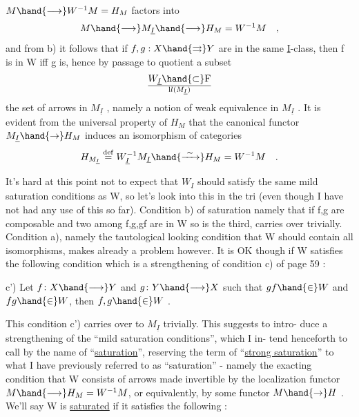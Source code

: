 
$M\hand{\longrightarrow} W^{-1}M=H_M$ factors into
\[ M\hand{\longrightarrow} M_{\underline{I}}\hand{\longrightarrow} H_M = W^{-1}M \quad , \]
and from b) it follows that if $f,g : X\hand{\rightrightarrows} Y$ are in the same \underline{I}-class, then
f is in W iff g is, hence by passage to quotient a subset
\[ W_{\underline{I}}\hand{\subset} \mathrm F\over{\mathrm l}{l}(M_{\underline{I}}) \]
 the set of arrows in $M_{\underline{I}}$ , namely a notion of  weak equivalence in
$M_{\underline{I}}$ . It is evident from the universal property of $H_M$ that the canonical
functor $M_{\underline{I}}\hand{\to} H_M$ induces an isomorphism of categories
\[ H_{M_{\underline{I}}} \overset{\mathrm{def}}{=} W_{\underline{I}}^{-1}M_{\underline{I}} \hand{\xrightarrow{\ \sim\ }} H_M = W^{-1}M \quad . \]

It's hard at this point not to expect that $W_{\underline{I}}$ should satisfy the same mild
saturation conditions as W, so let's look into this in the tri (even
though I have not had any use of this so far). Condition b) of saturation\hand{,}
namely that if f,g are composable and two among f,g,gf are in W so is the
third, carries over trivially. Condition a), namely the tautological
looking condition that W should contain all isomorphisms, makes already
a problem however. It is OK though if W satisfies the following  condition\hand{,}
which is a strengthening of condition c) of page 59 :

c') Let $f\colon X\hand{\longrightarrow} Y$ and $g\colon Y\hand{\longrightarrow} X$ such that $gf\hand{\in} W$ and $fg\hand{\in} W$, then
$f,g\hand{\in} W$ .

This condition c') carries over to $M_{\underline{I}}$ trivially. This suggests to intro-%
duce a strengthening of the ``mild saturation conditions'', which  I in-%
tend henceforth to call by the name of ``\uline{saturation}'', reserving the term
of ``\uline{strong saturation}'' to what I have previously referred to 
as ``saturation'' - namely the  exacting condition that W consists of \uline{}
arrows made invertible by the localization functor $M\hand{\longrightarrow} H_M=W^{-1}M$, or
equivalently, by some functor $M\hand{\to} H$ .  We'll say W is \uline{saturated} if it
satisfies the following :

